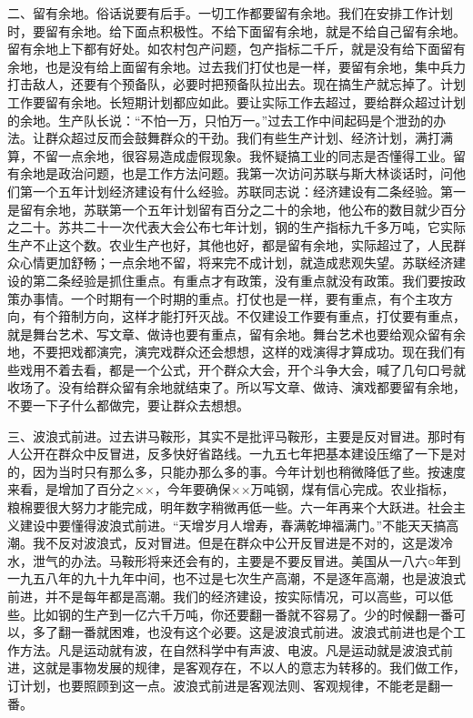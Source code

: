 二、留有余地。俗话说要有后手。一切工作都要留有余地。我们在安排工作计划时，要留有余地。给下面点积极性。不给下面留有余地，就是不给自己留有余地。留有余地上下都有好处。如农村包产问题，包产指标二千斤，就是没有给下面留有余地，也是没有给上面留有余地。过去我们打仗也是一样，要留有余地，集中兵力打击敌人，还要有个预备队，必要时把预备队拉出去。现在搞生产就忘掉了。计划工作要留有余地。长短期计划都应如此。要让实际工作去超过，要给群众超过计划的余地。生产队长说：“不怕一万，只怕万一。”过去工作中间起码是个泄劲的办法。让群众超过反而会鼓舞群众的干劲。我们有些生产计划、经济计划，满打满算，不留一点余地，很容易造成虚假现象。我怀疑搞工业的同志是否懂得工业。留有余地是政治问题，也是工作方法问题。我第一次访问苏联与斯大林谈话时，问他们第一个五年计划经济建设有什么经验。苏联同志说：经济建设有二条经验。第一是留有余地，苏联第一个五年计划留有百分之二十的余地，他公布的数目就少百分之二十。苏共二十一次代表大会公布七年计划，钢的生产指标九千多万吨，它实际生产不止这个数。农业生产也好，其他也好，都是留有余地，实际超过了，人民群众心情更加舒畅；一点余地不留，将来完不成计划，就造成悲观失望。苏联经济建设的第二条经验是抓住重点。有重点才有政策，没有重点就没有政策。我们要按政策办事情。一个时期有一个时期的重点。打仗也是一样，要有重点，有个主攻方向，有个箝制方向，这样才能打歼灭战。不仅建设工作要有重点，打仗要有重点，就是舞台艺术、写文章、做诗也要有重点，留有余地。舞台艺术也要给观众留有余地，不要把戏都演完，演完戏群众还会想想，这样的戏演得才算成功。现在我们有些戏用不着去看，都是一个公式，开个群众大会，开个斗争大会，喊了几句口号就收场了。没有给群众留有余地就结束了。所以写文章、做诗、演戏都要留有余地，不要一下子什么都做完，要让群众去想想。

三、波浪式前进。过去讲马鞍形，其实不是批评马鞍形，主要是反对冒进。那时有人公开在群众中反冒进，反多快好省路线。一九五七年把基本建设压缩了一下是对的，因为当时只有那么多，只能办那么多的事。今年计划也稍微降低了些。按速度来看，是增加了百分之××，今年要确保××万吨钢，煤有信心完成。农业指标，粮棉要很大努力才能完成，明年数字稍微再低一些。六一年再来个大跃进。社会主义建设中要懂得波浪式前进。“天增岁月人增寿，春满乾坤福满门。”不能天天搞高潮。我不反对波浪式，反对冒进。但是在群众中公开反冒进是不对的，这是泼冷水，泄气的办法。马鞍形将来还会有的，主要是不要反冒进。美国从一八六○年到一九五八年的九十九年中间，也不过是七次生产高潮，不是逐年高潮，也是波浪式前进，并不是每年都是高潮。我们的经济建设，按实际情况，可以高些，可以低些。比如钢的生产到一亿六千万吨，你还要翻一番就不容易了。少的时候翻一番可以，多了翻一番就困难，也没有这个必要。这是波浪式前进。波浪式前进也是个工作方法。凡是运动就有波，在自然科学中有声波、电波。凡是运动就是波浪式前进，这就是事物发展的规律，是客观存在，不以人的意志为转移的。我们做工作，订计划，也要照顾到这一点。波浪式前进是客观法则、客观规律，不能老是翻一番。

